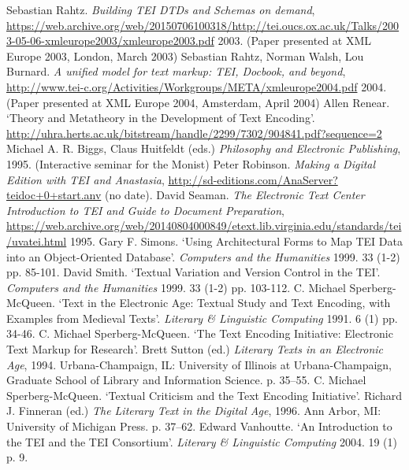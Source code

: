 \begin{bibitemlist}{1}
\label{Rahtz2003}Sebastian Rahtz. \textit{Building TEI DTDs and Schemas on demand},  \url{https://web.archive.org/web/20150706100318/http://tei.oucs.ox.ac.uk/Talks/2003-05-06-xmleurope2003/xmleurope2003.pdf} 2003.  (Paper presented at XML Europe 2003, London, March 2003)
\label{Rahtzetal2004}Sebastian Rahtz, Norman Walsh, Lou Burnard. \textit{A unified model for text markup: TEI, Docbook, and beyond},  \url{http://www.tei-c.org/Activities/Workgroups/META/xmleurope2004.pdf} 2004.  (Paper presented at XML Europe 2004, Amsterdam, April 2004)
\label{Renear1995}Allen Renear. ‘Theory and Metatheory in the Development of Text Encoding’.  \url{http://uhra.herts.ac.uk/bitstream/handle/2299/7302/904841.pdf?sequence=2} Michael A. R. Biggs, Claus Huitfeldt (eds.) \textit{Philosophy and Electronic Publishing}, 1995.  (Interactive seminar for the Monist)
\label{Robinsonnodate}Peter Robinson. \textit{Making a Digital Edition with TEI and Anastasia},  \url{http://sd-editions.com/AnaServer?teidoc+0+start.anv} (no date). 
\label{Seaman1995}David Seaman. \textit{The Electronic Text Center Introduction to TEI and Guide to Document Preparation},  \url{https://web.archive.org/web/20140804000849/etext.lib.virginia.edu/standards/tei/uvatei.html} 1995. 
\label{Simons1999}Gary F. Simons. ‘Using Architectural Forms to Map TEI Data into an Object-Oriented Database’.  \textit{Computers and the Humanities} 1999. 33  (1-2)  pp. 85-101. 
\label{Smith1999}David Smith. ‘Textual Variation and Version Control in the TEI’.  \textit{Computers and the Humanities} 1999. 33  (1-2)  pp. 103-112. 
\label{SperbergMcQueen1991}C. Michael Sperberg-McQueen. ‘Text in the Electronic Age: Textual Study and Text Encoding, with Examples from Medieval Texts’.  \textit{Literary \& Linguistic Computing} 1991. 6  (1)  pp. 34-46. 
\label{SperbergMcQueen1994}C. Michael Sperberg-McQueen. ‘The Text Encoding Initiative: Electronic Text Markup for Research’. Brett Sutton (ed.) \textit{Literary Texts in an Electronic Age}, 1994. Urbana-Champaign, IL: University of Illinois at Urbana-Champaign, Graduate School of Library and Information Science. p. 35–55. 
\label{SperbergMcQueen1996}C. Michael Sperberg-McQueen. ‘Textual Criticism and the Text Encoding Initiative’. Richard J. Finneran (ed.) \textit{The Literary Text in the Digital Age}, 1996. Ann Arbor, MI: University of Michigan Press. p. 37–62. 
\label{Vanhoutte2004}Edward Vanhoutte. ‘An Introduction to the TEI and the TEI Consortium’.  \textit{Literary \& Linguistic Computing} 2004. 19  (1)  p. 9. 
\end{bibitemlist}
